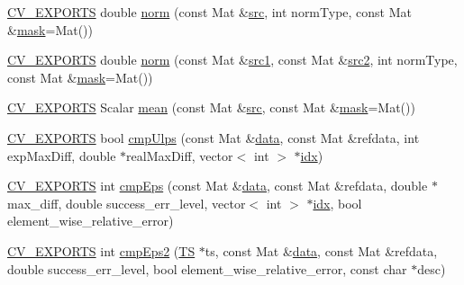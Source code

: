 \begin{DoxyCompactItemize}
\item 
\hyperlink{core_2types__c_8h_a1bf9f0e121b54272da02379cfccd0a2b}{C\-V\-\_\-\-E\-X\-P\-O\-R\-T\-S} double \hyperlink{namespacecvtest_afe0b69beddeea94657c1b36b104acaa4}{norm} (const Mat \&\hyperlink{legacy_8hpp_a371cd109b74033bc4366f584edd3dacc}{src}, int norm\-Type, const Mat \&\hyperlink{tracking_8hpp_a6b13ecd2fd6ec7ad422f1d7863c3ad19}{mask}=Mat())
\item 
\hyperlink{core_2types__c_8h_a1bf9f0e121b54272da02379cfccd0a2b}{C\-V\-\_\-\-E\-X\-P\-O\-R\-T\-S} double \hyperlink{namespacecvtest_a1779e0c4158a2ffa0d6fa249327f3ee2}{norm} (const Mat \&\hyperlink{core__c_8h_a897de4702c922f4cccda0d57ccdcafb3}{src1}, const Mat \&\hyperlink{core__c_8h_a7561a36d48069d54a6c8ac4e4750edfd}{src2}, int norm\-Type, const Mat \&\hyperlink{tracking_8hpp_a6b13ecd2fd6ec7ad422f1d7863c3ad19}{mask}=Mat())
\item 
\hyperlink{core_2types__c_8h_a1bf9f0e121b54272da02379cfccd0a2b}{C\-V\-\_\-\-E\-X\-P\-O\-R\-T\-S} Scalar \hyperlink{namespacecvtest_afd1b0e1dfbfdaea885e52c2a75bd9d81}{mean} (const Mat \&\hyperlink{legacy_8hpp_a371cd109b74033bc4366f584edd3dacc}{src}, const Mat \&\hyperlink{tracking_8hpp_a6b13ecd2fd6ec7ad422f1d7863c3ad19}{mask}=Mat())
\item 
\hyperlink{core_2types__c_8h_a1bf9f0e121b54272da02379cfccd0a2b}{C\-V\-\_\-\-E\-X\-P\-O\-R\-T\-S} bool \hyperlink{namespacecvtest_a67cfdf3f5efcf71a6783b0995546f20f}{cmp\-Ulps} (const Mat \&\hyperlink{legacy_8hpp_ab9fe6c09e6d02865a953fffc12fe6ca0}{data}, const Mat \&refdata, int exp\-Max\-Diff, double $\ast$real\-Max\-Diff, vector$<$ int $>$ $\ast$\hyperlink{core__c_8h_a5c7c842f447336aa2f10826df65a28b3}{idx})
\item 
\hyperlink{core_2types__c_8h_a1bf9f0e121b54272da02379cfccd0a2b}{C\-V\-\_\-\-E\-X\-P\-O\-R\-T\-S} int \hyperlink{namespacecvtest_a2ddc262232f5485daac0e20b1b31037c}{cmp\-Eps} (const Mat \&\hyperlink{legacy_8hpp_ab9fe6c09e6d02865a953fffc12fe6ca0}{data}, const Mat \&refdata, double $\ast$max\-\_\-diff, double success\-\_\-err\-\_\-level, vector$<$ int $>$ $\ast$\hyperlink{core__c_8h_a5c7c842f447336aa2f10826df65a28b3}{idx}, bool element\-\_\-wise\-\_\-relative\-\_\-error)
\item 
\hyperlink{core_2types__c_8h_a1bf9f0e121b54272da02379cfccd0a2b}{C\-V\-\_\-\-E\-X\-P\-O\-R\-T\-S} int \hyperlink{namespacecvtest_acb38dbcf89cbc383085ba144365fab07}{cmp\-Eps2} (\hyperlink{classcvtest_1_1TS}{T\-S} $\ast$ts, const Mat \&\hyperlink{legacy_8hpp_ab9fe6c09e6d02865a953fffc12fe6ca0}{data}, const Mat \&refdata, double success\-\_\-err\-\_\-level, bool element\-\_\-wise\-\_\-relative\-\_\-error, const char $\ast$desc)

\end{DoxyCompactItemize}
